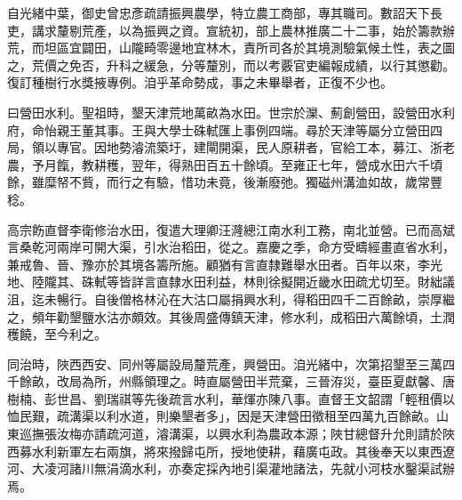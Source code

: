 \begin{pinyinscope}
自光緒中葉，御史曾忠彥疏請振興農學，特立農工商部，專其職司。數詔天下長吏，講求釐剔荒產，以為振興之資。宣統初，部上農林推廣二十二事，始於籌款辦荒，而坦區宜闢田，山隴畸零邊地宜林木，責所司各於其境測驗氣候土性，表之圖之，荒價之免否，升科之緩急，分等釐別，而以考覈官吏編報成績，以行其懲勸。復訂種樹行水獎掖專例。洎乎革命勢成，事之未畢舉者，正復不少也。

曰營田水利。聖祖時，墾天津荒地萬畝為水田。世宗於灤、薊創營田，設營田水利府，命怡親王董其事。王與大學士硃軾匯上事例四端。尋於天津等屬分立營田四局，領以專官。因地勢濬流築圩，建閘開渠，民人原耕者，官給工本，募江、浙老農，予月餼，教耕穫，翌年，得熟田百五十餘頃。至雍正七年，營成水田六千頃餘，雖糜帑不貲，而行之有驗，惜功未竟，後漸廢弛。獨磁州溝洫如故，歲常豐稔。

高宗飭直督李衛修治水田，復遣大理卿汪漋總江南水利工務，南北並營。已而高斌言桑乾河兩岸可開大渠，引水治稻田，從之。嘉慶之季，命方受疇經畫直省水利，兼戒魯、晉、豫亦於其境各籌所施。顧猶有言直隸難舉水田者。百年以來，李光地、陸隴其、硃軾等皆詳言直隸水田利益，林則徐擬開近畿水田疏尤切至。財絀議沮，迄未暢行。自後僧格林沁在大沽口屬捐興水利，得稻田四千二百餘畝，崇厚繼之，頻年勸墾鹽水沽亦頗效。其後周盛傳鎮天津，修水利，成稻田六萬餘頃，土潤穫饒，至今利之。

同治時，陜西西安、同州等屬設局釐荒產，興營田。洎光緒中，次第招墾至三萬四千餘畝，改局為所，州縣領理之。時直屬營田半荒棄，三晉洊災，臺臣夏獻馨、唐樹楠、彭世昌、劉瑞祺等先後疏言水利，華煇亦陳八事。直督王文韶謂「輕租價以恤民艱，疏溝渠以利水道，則樂墾者多」，因是天津營田徵租至四萬九百餘畝。山東巡撫張汝梅亦請疏河道，濬溝渠，以興水利為農政本源；陜甘總督升允則請於陜西募水利新軍左右兩旗，將來撥歸屯所，授地使耕，藉廣屯政。其後奉天以東西遼河、大凌河諸川無涓滴水利，亦奏定採內地引渠灌地諸法，先就小河枝水鑿渠試辦焉。


\end{pinyinscope}
